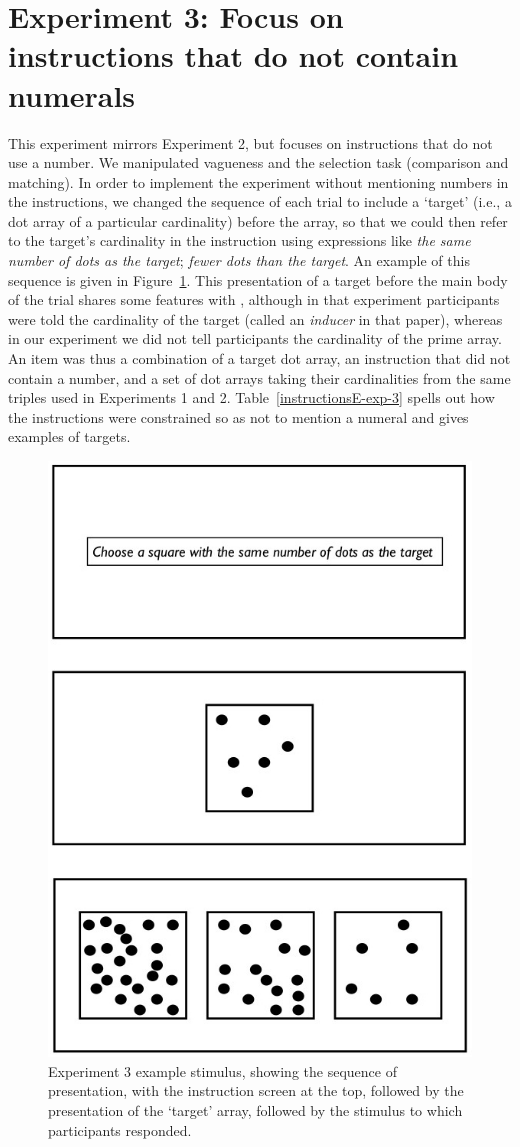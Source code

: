 \documentclass[ %
  graybox       %
 ,envcountchap  %
 ,sectrefs      %
]{svmono}
\begin{document}
\section{Experiment 3: Focus on instructions that do not contain numerals}
This experiment mirrors Experiment 2, but focuses on instructions that do not use a number. We manipulated vagueness and the selection task (comparison and matching). In order to implement the experiment without mentioning numbers in the instructions, we changed the sequence of each trial to include a `target' (i.e., a dot array of a particular cardinality) before the array, so that we could then refer to the target's cardinality in the instruction using expressions like \emph{the same number of dots as the target}; \emph{fewer dots than the target}. An example of this sequence is given in Figure~\ref{Experiment3examplestimulus}. This presentation of a target before the main body of the trial shares some features with \citeauthor[Experiment 2]{Izard20081221}, although in that experiment participants were told the cardinality of the target (called an \emph{inducer} in that paper), whereas in our experiment we did not tell participants the cardinality of the prime array. An item was thus a combination of a target dot array, an instruction that did not contain a number, and a set of dot arrays taking their cardinalities from the same triples used in Experiments 1 and 2. Table~\ref{instructionsE-exp-3} spells out how the instructions were constrained so as not to mention a numeral and gives examples of targets.

\begin{figure}[htbp]
\centering
\includegraphics[width=.5\textwidth]{figures/Ee3-flow.jpg}
\caption{Experiment 3 example stimulus, showing the sequence of presentation, with the instruction screen at the top, followed by the presentation of the `target' array, followed by the stimulus to which participants responded.}
\label{Experiment3examplestimulus}
\end{figure}
\end{document}
